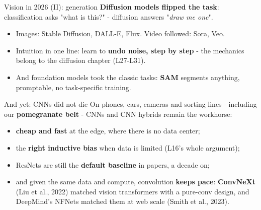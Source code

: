 \documentclass[aspectratio=169]{beamer}
\begin{document}
\begin{frame}{Vision in 2026 (II): generation}
  \textbf{Diffusion models flipped the task}: classification asks "what is this?" -
  diffusion answers "\emph{draw me one}".
  \vskip 6pt
  \begin{itemize}
    \item Images: Stable Diffusion, DALL-E, Flux. Video followed: Sora, Veo.
    \item Intuition in one line: learn to \textbf{undo noise, step by step} - the
      mechanics belong to the diffusion chapter (L27-L31).
    \item And foundation models took the classic tasks: \textbf{SAM} segments
      anything, promptable, no task-specific training.
  \end{itemize}
  \vskip 8pt
  \vskip 4pt
  \begin{center}
    \href{https://sam2.metademolab.com/}{}
  \end{center}
\end{frame}

\begin{frame}{And yet: CNNs did not die}
  On phones, cars, cameras and sorting lines - including our \textbf{pomegranate
  belt} - CNNs and CNN hybrids remain the workhorse:
  \vskip 6pt
  \begin{itemize}
    \item \textbf{cheap and fast} at the edge, where there is no data center;
    \item the \textbf{right inductive bias} when data is limited (L16's whole
      argument);
    \item ResNets are still the \textbf{default baseline} in papers, a decade on;
    \item and given the same data and compute, convolution \textbf{keeps pace}:
      \textbf{ConvNeXt} (Liu et al., 2022) matched vision transformers with a pure-conv
      design, and DeepMind's NFNets matched them at web scale (Smith et al., 2023).
  \end{itemize}
  \vskip 8pt
\end{frame}
\end{document}
